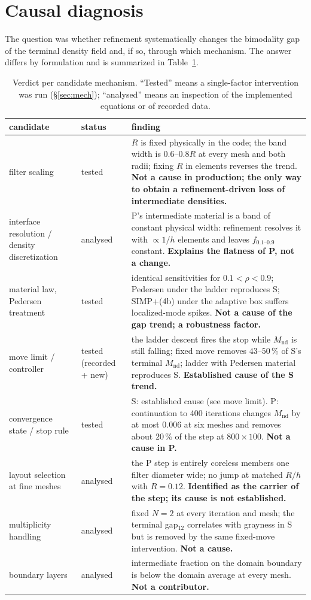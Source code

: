 \documentclass[10pt,a4paper]{article}
\newcommand{\Mnd}{M_{\mathrm{nd}}}
\newcommand{\fgray}{f_{0.1\text{--}0.9}}
\begin{document}
\section{Causal diagnosis}\label{sec:diag}

The question was whether refinement systematically changes the bimodality gap of the terminal density field and, if so, through which mechanism. The answer differs by formulation and is summarized in Table~\ref{tab:verdict}.

\begin{table}[htb]\centering\footnotesize
\caption{Verdict per candidate mechanism. ``Tested'' means a single-factor intervention was run (\S\ref{sec:mech}); ``analysed'' means an inspection of the implemented equations or of recorded data.}
\label{tab:verdict}
\setlength{\tabcolsep}{4pt}\begin{tabular}{p{3.4cm}p{1.9cm}p{10.0cm}}\toprule
candidate & status & finding\\\midrule
filter scaling & tested & $R$ is fixed physically in the code; the band width is $0.6$--$0.8R$ at every mesh and both radii; fixing $R$ in elements reverses the trend. \textbf{Not a cause in production; the only way to obtain a refinement-driven loss of intermediate densities.}\\
interface resolution / density discretization & analysed & P's intermediate material is a band of constant physical width: refinement resolves it with $\propto1/h$ elements and leaves $\fgray$ constant. \textbf{Explains the flatness of P, not a change.}\\
material law, Pedersen treatment & tested & identical sensitivities for $0.1<\rho<0.9$; Pedersen under the ladder reproduces S; SIMP+(4b) under the adaptive box suffers localized-mode spikes. \textbf{Not a cause of the gap trend; a robustness factor.}\\
move limit / controller & tested (recorded + new) & the ladder descent fires the stop while $\Mnd$ is still falling; fixed move removes $43$--$50\,\%$ of S's terminal $\Mnd$; ladder with Pedersen material reproduces S. \textbf{Established cause of the S trend.}\\
convergence state / stop rule & tested & S: established cause (see move limit). P: continuation to 400 iterations changes $\Mnd$ by at most $0.006$ at six meshes and removes about $20\,\%$ of the step at $800\times100$. \textbf{Not a cause in P.}\\
layout selection at fine meshes & analysed & the P step is entirely coreless members one filter diameter wide; no jump at matched $R/h$ with $R=0.12$. \textbf{Identified as the carrier of the step; its cause is not established.}\\
multiplicity handling & analysed & fixed $N=2$ at every iteration and mesh; the terminal gap$_{12}$ correlates with grayness in S but is removed by the same fixed-move intervention. \textbf{Not a cause.}\\
boundary layers & analysed & intermediate fraction on the domain boundary is below the domain average at every mesh. \textbf{Not a contributor.}\\
\bottomrule\end{tabular}
\end{table}
\end{document}
